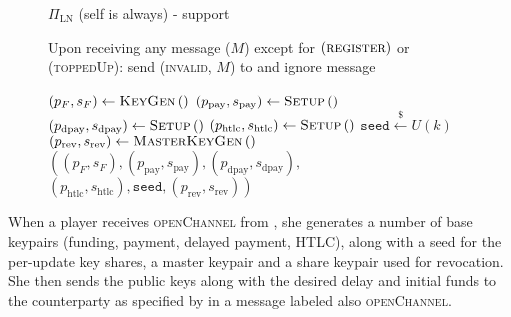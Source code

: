 \begin{figure}[H]
\begin{protocolbox}{$\Pi_{\mathrm{LN}}$ (self is \alice{} always) - support}
\begin{algorithmic}[1]
        \State Upon receiving any message ($M$) except for
        $\left(\textsc{register}\right)$ or (\textsc{toppedUp}):
        \Indent
            \State send (\textsc{invalid}, $M$) to \environment{} and ignore
            message
          \EndIf
        \EndIndent
        \Statex

          \State $\left(p_F, s_F\right) \gets \textsc{KeyGen}\left(\right)$
          \label{alg:protocol:support:gen:fund}
          \State $\left(p_{\mathrm{pay}}, s_{\mathrm{pay}}\right) \gets
          \textsc{Setup}\left(\right)$ 
          \State $\left(p_{\mathrm{dpay}}, s_{\mathrm{dpay}}\right) \gets
          \textsc{Setup}\left(\right)$ 
          \State $\left(p_{\mathrm{htlc}}, s_{\mathrm{htlc}}\right) \gets
          \textsc{Setup}\left(\right)$ 
          \State $\texttt{seed} \overset{\$}{\gets} U(k)$ 
          \State $\left(p_{\mathrm{rev}}, s_{\mathrm{rev}}\right) \gets
          \textsc{MasterKeyGen}\left(\right)$ 
          \label{alg:protocol:support:gen:rev}
          \State \Return $\left(\left(p_F, s_F\right), \left(p_{\mathrm{pay}},
          s_{\mathrm{pay}}\right), \left(p_{\mathrm{dpay}},
          s_{\mathrm{dpay}}\right),\right.$
          \Indent
            \State $\left.\left(p_{\mathrm{htlc}}, s_{\mathrm{htlc}}\right),
            \mathtt{seed}, \left(p_{\mathrm{rev}},
            s_{\mathrm{rev}}\right)\right)$
          \EndIndent
        \EndFunction
      \end{algorithmic}
    \end{protocolbox}
    \caption{}
    \label{alg:protocol:support}
  \end{figure}

  When a player receives \textsc{openChannel} from \environment, she generates a
  number of base keypairs (funding, payment, delayed payment, HTLC), along with
  a seed for the per-update key shares, a master keypair and a share keypair
  used for revocation. She then sends the public keys along with the desired
  delay and initial funds to the counterparty as specified by \environment{} in
  a message labeled also \textsc{openChannel}.

